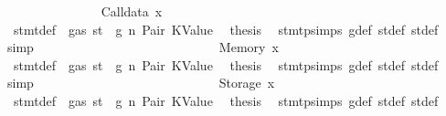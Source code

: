\begin{isabellebody}
\isanewline
\ \ \ \ \ \ \ \ \ \ \ \ \ \ \isamarkupfalse%
\ {\isacharparenleft}{\kern0pt}Calldata\ x{}{\isacharparenright}{\kern0pt}\isanewline
\ \ \ \ \ \ \ \ \ \ \ \ \ \ \isamarkupfalse%
\ {}{\isacharparenleft}{\kern0pt}{}{\isacharparenright}{\kern0pt}\ stmt{\isacharunderscore}{\kern0pt}def\ {\isacharbackquoteopen}{\isasymnot}\ gas\ st\ {\isasymle}\ g{\isacharbackquoteclose}\ n\ Pair\ KValue\ \isamarkupfalse%
\ {\isacharquery}{\kern0pt}thesis\ \isamarkupfalse%
\ stmt{\isachardot}{\kern0pt}psimps{\isacharparenleft}{\kern0pt}{}{\isacharparenright}{\kern0pt}\ g{\isacharunderscore}{\kern0pt}def\ st{\isacharprime}{\kern0pt}{\isacharunderscore}{\kern0pt}def\ st{\isacharprime}{\kern0pt}{\isacharprime}{\kern0pt}{\isacharunderscore}{\kern0pt}def\ \isamarkupfalse%
\ simp\isanewline
\ \ \ \ \ \ \ \ \ \ \ \ \isamarkupfalse%
\isanewline
\ \ \ \ \ \ \ \ \ \ \ \ \ \ \isamarkupfalse%
\ {\isacharparenleft}{\kern0pt}Memory\ x{}{\isacharparenright}{\kern0pt}\isanewline
\ \ \ \ \ \ \ \ \ \ \ \ \ \ \isamarkupfalse%
\ {}{\isacharparenleft}{\kern0pt}{}{\isacharparenright}{\kern0pt}\ stmt{\isacharunderscore}{\kern0pt}def\ {\isacharbackquoteopen}{\isasymnot}\ gas\ st\ {\isasymle}\ g{\isacharbackquoteclose}\ n\ Pair\ KValue\ \isamarkupfalse%
\ {\isacharquery}{\kern0pt}thesis\ \isamarkupfalse%
\ stmt{\isachardot}{\kern0pt}psimps{\isacharparenleft}{\kern0pt}{}{\isacharparenright}{\kern0pt}\ g{\isacharunderscore}{\kern0pt}def\ st{\isacharprime}{\kern0pt}{\isacharunderscore}{\kern0pt}def\ st{\isacharprime}{\kern0pt}{\isacharprime}{\kern0pt}{\isacharunderscore}{\kern0pt}def\ \isamarkupfalse%
\ simp\isanewline
\ \ \ \ \ \ \ \ \ \ \ \ \isamarkupfalse%
\isanewline
\ \ \ \ \ \ \ \ \ \ \ \ \ \ \isamarkupfalse%
\ {\isacharparenleft}{\kern0pt}Storage\ x{}{\isacharparenright}{\kern0pt}\isanewline
\ \ \ \ \ \ \ \ \ \ \ \ \ \ \isamarkupfalse%
\ {}{\isacharparenleft}{\kern0pt}{}{\isacharparenright}{\kern0pt}\ stmt{\isacharunderscore}{\kern0pt}def\ {\isacharbackquoteopen}{\isasymnot}\ gas\ st\ {\isasymle}\ g{\isacharbackquoteclose}\ n\ Pair\ KValue\ \isamarkupfalse%
\ {\isacharquery}{\kern0pt}thesis\ \isamarkupfalse%
\ stmt{\isachardot}{\kern0pt}psimps{\isacharparenleft}{\kern0pt}{}{\isacharparenright}{\kern0pt}\ g{\isacharunderscore}{\kern0pt}def\ st{\isacharprime}{\kern0pt}{\isacharunderscore}{\kern0pt}def\ st{\isacharprime}{\kern0pt}{\isacharprime}{\kern0pt}{\isacharunderscore}{\kern0pt}def\ \isamarkupfalse%

\end{isabellebody}
